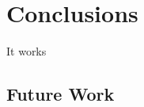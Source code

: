 \chapter{Conclusions} \label{Chapter: Conclusions}
It works

\section{Future Work} \label{Section: Future Work}